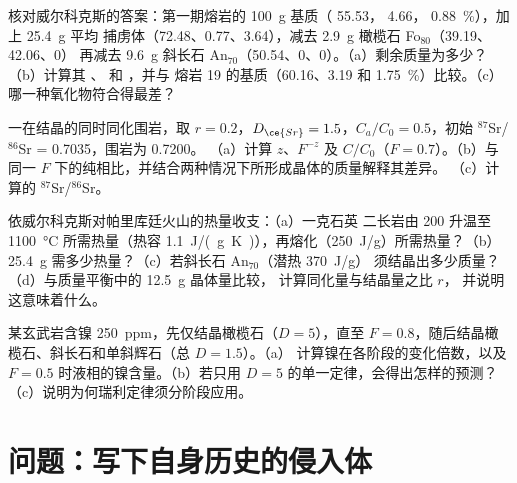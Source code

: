 \begin{exercise}[$\star\star$]\label{exo:b2:magmatic-differentiation:9}
核对威尔科克斯的答案：第一期熔岩的 \qty{100}{g} 基质（
55.53， 4.66， \qty{0.88}{\percent}），加上 \qty{25.4}{g} 平均
捕虏体（72.48、0.77、3.64），减去 \qty{2.9}{g} 橄榄石 Fo$_{80}$（39.19、42.06、0）
再减去 \qty{9.6}{g} 斜长石 An$_{70}$（50.54、0、0）。（a）剩余质量为多少？
（b）计算其 、 和 ，并与
熔岩 19 的基质（60.16、3.19 和 \qty{1.75}{\percent}）比较。（c）哪一种氧化物符合得最差？
\end{exercise}

\begin{exercise}[$\star\star\star$]\label{exo:b2:magmatic-differentiation:10}
一在结晶的同时同化围岩，取 $r = 0.2$，$D_{\ce{Sr}} =
1.5$，$C_a/C_0 = 0.5$，初始 $^{87}$Sr/$^{86}$Sr = 0.7035，围岩为 0.7200。
（a）计算 $z$、$F^{-z}$ 及 $C/C_0$（$F = 0.7$）。（b）与同一 $F$ 下的纯相比，并结合两种情况下所形成晶体的质量解释其差异。
（c）计算的 $^{87}$Sr/$^{86}$Sr。
\end{exercise}

\begin{exercise}[$\star\star\star$]\label{exo:b2:magmatic-differentiation:11}
依威尔科克斯对帕里库廷火山的热量收支：（a）一克石英
二长岩由 200 升温至 \qty{1100}{\celsius} 所需热量（热容
\qty{1.1}{J/(g.K)}），再熔化（\qty{250}{J/g}）所需热量？（b）
\qty{25.4}{g} 需多少热量？（c）若斜长石 An$_{70}$（潜热 \qty{370}{J/g}）
须结晶出多少质量？（d）与质量平衡中的 \qty{12.5}{g} 晶体量比较，
计算同化量与结晶量之比 $r$，
并说明这意味着什么。
\end{exercise}

\begin{exercise}[$\star\star\star$]\label{exo:b2:magmatic-differentiation:12}
某玄武岩含镍 \qty{250}{ppm}，先仅结晶橄榄石（$D = 5$），直至
$F = 0.8$，随后结晶橄榄石、斜长石和单斜辉石（总 $D = 1.5$）。（a）
计算镍在各阶段的变化倍数，以及
$F = 0.5$ 时液相的镍含量。（b）若只用 $D = 5$ 的单一定律，会得出怎样的预测？
（c）说明为何瑞利定律须分阶段应用。
\end{exercise}

\section{问题：写下自身历史的侵入体}

